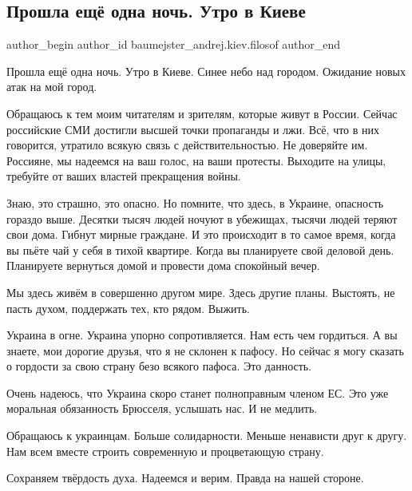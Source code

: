  
 
 
 
 
 
\subsection{Прошла ещё одна ночь. Утро в Киеве}
\label{sec:27_02_2022.fb.baumejster_andrej.kiev.filosof.1.utro_v_kieve}
 
\ifcmt
 author_begin
   author_id baumejster_andrej.kiev.filosof
 author_end
\fi

Прошла ещё одна ночь. Утро в Киеве. Синее небо над городом. Ожидание новых атак
на мой город. 

Обращаюсь к тем моим читателям и зрителям, которые живут в России. Сейчас
российские СМИ достигли высшей точки пропаганды и лжи. Всё, что в них
говорится, утратило всякую связь с действительностью. Не доверяйте им.
Россияне, мы надеемся на ваш голос, на ваши протесты. Выходите на улицы,
требуйте от ваших властей прекращения войны.

Знаю, это страшно, это опасно. Но помните, что здесь, в Украине, опасность
гораздо выше. Десятки тысяч людей ночуют в убежищах, тысячи людей теряют свои
дома. Гибнут мирные граждане. И это происходит в то самое время, когда вы пьёте
чай у себя в тихой квартире. Когда вы планируете свой деловой день. Планируете
вернуться домой и провести дома спокойный вечер. 

Мы здесь живём в совершенно другом мире. Здесь другие планы. Выстоять, не пасть
духом, поддержать тех, кто рядом. Выжить. 

Украина в огне. Украина упорно сопротивляется. Нам есть чем гордиться. А вы
знаете, мои дорогие друзья, что я не склонен к пафосу. Но сейчас я могу сказать
о гордости за свою страну безо всякого пафоса. Это данность. 

Очень надеюсь, что Украина скоро станет полноправным членом ЕС. Это уже
моральная обязанность Брюсселя, услышать нас. И не медлить.

Обращаюсь к украинцам. Больше солидарности. Меньше ненависти друг к другу. Нам
всем вместе строить современную и процветающую страну.

Сохраняем твёрдость духа. Надеемся и верим. Правда на нашей стороне.

